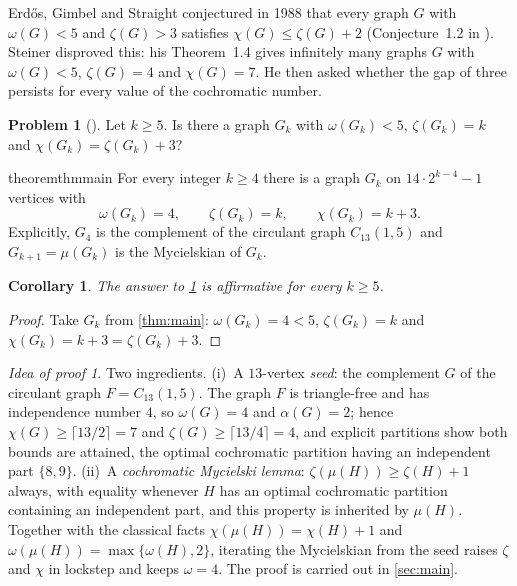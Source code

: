 \documentclass[11pt,a4paper]{article}
\theoremstyle{plain}
\newtheorem{corollary}[theorem]{Corollary}
\theoremstyle{definition}
\newtheorem{problem}[theorem]{Problem}
\theoremstyle{remark}
\newtheorem*{proofidea}{Idea of proof}
\newcommand{\myc}{\mu}
\begin{document}
Erdős, Gimbel and Straight conjectured in 1988 that every graph $G$ with $\omega(G)<5$ and $\zeta(G)>3$ satisfies $\chi(G)\le\zeta(G)+2$ (Conjecture~1.2 in \cite{Steiner24}). Steiner \cite{Steiner24} disproved this: his Theorem~1.4 gives infinitely many graphs $G$ with $\omega(G)<5$, $\zeta(G)=4$ and $\chi(G)=7$. He then asked whether the gap of three persists for every value of the cochromatic number.

\begin{problem}[{\cite[Problem~1.5]{Steiner24}}]\label{prob:15}
Let $k\ge5$. Is there a graph $G_k$ with $\omega(G_k)<5$, $\zeta(G_k)=k$ and $\chi(G_k)=\zeta(G_k)+3$?
\end{problem}

\begin{restatable}{theorem}{thmmain}\label{thm:main}
For every integer $k\ge4$ there is a graph $G_k$ on $14\cdot2^{k-4}-1$ vertices with
\[
\omega(G_k)=4,\qquad \zeta(G_k)=k,\qquad \chi(G_k)=k+3 .
\]
Explicitly, $G_4$ is the complement of the circulant graph $C_{13}(1,5)$ and $G_{k+1}=\myc(G_k)$ is the Mycielskian of $G_k$.
\end{restatable}

\begin{corollary}\label{cor:15}
The answer to \cref{prob:15} is affirmative for every $k\ge5$.
\end{corollary}
\begin{proof}
Take $G_k$ from \cref{thm:main}: $\omega(G_k)=4<5$, $\zeta(G_k)=k$ and $\chi(G_k)=k+3=\zeta(G_k)+3$.
\end{proof}

\begin{proofidea}
Two ingredients. (i)~A $13$-vertex \emph{seed}: the complement $G$ of the circulant graph $F=C_{13}(1,5)$. The graph $F$ is triangle-free and has independence number $4$, so $\omega(G)=4$ and $\alpha(G)=2$; hence $\chi(G)\ge\lceil13/2\rceil=7$ and $\zeta(G)\ge\lceil13/4\rceil=4$, and explicit partitions show both bounds are attained, the optimal cochromatic partition having an independent part $\{8,9\}$. (ii)~A \emph{cochromatic Mycielski lemma}: $\zeta(\myc(H))\ge\zeta(H)+1$ always, with equality whenever $H$ has an optimal cochromatic partition containing an independent part, and this property is inherited by $\myc(H)$. Together with the classical facts $\chi(\myc(H))=\chi(H)+1$ and $\omega(\myc(H))=\max\{\omega(H),2\}$, iterating the Mycielskian from the seed raises $\zeta$ and $\chi$ in lockstep and keeps $\omega=4$. The proof is carried out in \cref{sec:main}.
\end{proofidea}
\end{document}
